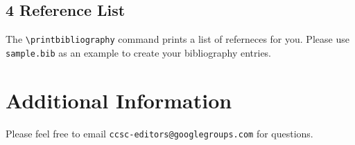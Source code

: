\documentclass[letter,12pt]{article}
\begin{document}
\subsection*{4 Reference List}
The \verb+\printbibliography+ command prints a list of referneces for you. Please use \texttt{sample.bib} as an example to create your bibliography entries.

\section*{Additional Information}
Please feel free to email \verb+ccsc-editors@googlegroups.com+ for questions.

\medskip

\printbibliography
\end{document}
